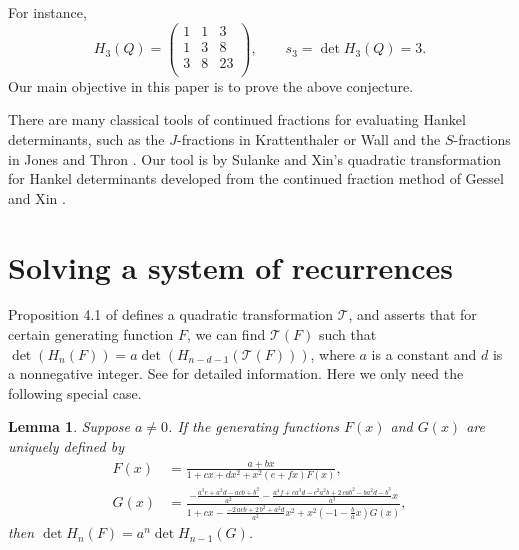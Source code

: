 \documentclass{fpsac}
\newtheorem{lemma}[theorem]{Lemma}
\begin{document}
For instance,
$$H_3(Q)= \left(
                 \begin{array}{ccc}
                   1 & 1 & 3 \\
                   1 & 3 & 8 \\
                   3 & 8 & 23 \\
                 \end{array}
               \right), \qquad s_3=\det H_3(Q)=3.
$$
Our main objective in this paper is to prove the above conjecture.

There are many classical tools of continued fractions for evaluating
Hankel determinants, such as the $J$-fractions in Krattenthaler
\cite{kratt} or Wall \cite{wall} and the $S$-fractions in Jones and
Thron \cite[Theorem~7.2]{cfraction}. Our tool is by  Sulanke and
Xin's quadratic transformation for Hankel determinants
\cite{Sulanke-xin} developed from the continued fraction method of
Gessel and Xin \cite{xingessel2}.

\section{Solving a system of recurrences}

Proposition 4.1 of \cite{Sulanke-xin} defines a quadratic
transformation ${\mathcal{T}}$, and asserts that for certain generating
function $F$, we can find ${\mathcal{T}}(F)$ such that $\det(H_n(F))=a \det
(H_{n-d-1}({\mathcal{T}}(F)))$, where $a$ is a constant and $d$ is a
nonnegative integer. See \cite{Sulanke-xin} for detailed
information. Here we only need the following special case.

\begin{lemma}\label{l-transform}
Suppose $a\ne 0$. If the generating functions $F(x)$ and $G(x)$ are
uniquely defined by \begin{align*}
 F(x)&=
\frac{a+bx}{1+cx+dx^2+x^2(e+fx)F(x)},\\
G(x)&=\frac{-{\frac {{a}^{3}e+{a}^{2}d-acb+{b}^{2}}{{a}^{2}}}-{\frac
{{a}^{4}f+c
{a}^{3}d-{c}^{2}{a}^{2}b+2\,ca{b}^{2}-b{a}^{2}d-{b}^{3}}{{a}^{3}}}x}{1+cx-
{\frac {-2\,acb+2\,{b}^{2}+{a}^{2}d}{{a}^{2}}}x^2+x^2(-1-{\frac
{b}{a}}x)G(x)} ,
\end{align*}
then $\det H_n(F) =a^n \det H_{n-1}(G)$.
\end{lemma}
\end{document}
